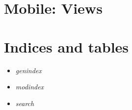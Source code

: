 \documentclass[letterpaper,10pt,english]{sphinxmanual}
\begin{document}
\chapter{Mobile: Views}
\label{generated/apps.mobile.views:module-apps.mobile.views}\label{generated/apps.mobile.views::doc}\label{generated/apps.mobile.views:mobile-views}

\begin{fulllineitems}
\label{generated/apps.mobile.views:apps.mobile.views.home}
\end{fulllineitems}



\chapter{Indices and tables}
\label{index:indices-and-tables}\begin{itemize}
\item {} 
\emph{genindex}

\item {} 
\emph{modindex}

\item {} 
\emph{search}

\end{itemize}
\end{document}
